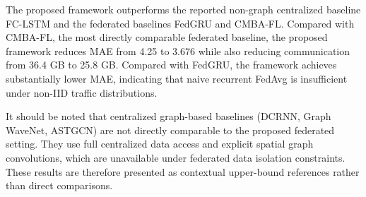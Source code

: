 The proposed framework outperforms the reported non-graph centralized baseline FC-LSTM and the federated baselines FedGRU and CMBA-FL. Compared with CMBA-FL, the most directly comparable federated baseline, the proposed framework reduces MAE from 4.25 to 3.676 while also reducing communication from 36.4 GB to 25.8 GB. Compared with FedGRU, the framework achieves substantially lower MAE, indicating that naive recurrent FedAvg is insufficient under non-IID traffic distributions.
 
It should be noted that centralized graph-based baselines (DCRNN, Graph WaveNet, ASTGCN) are not directly comparable to the proposed federated setting. They use full centralized data access and explicit spatial graph convolutions, which are unavailable under federated data isolation constraints. These results are therefore presented as contextual upper-bound references rather than direct comparisons.

